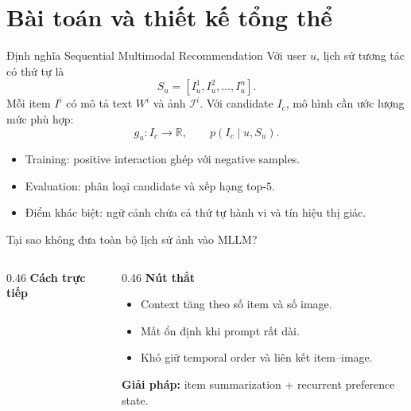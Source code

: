 \section{Bài toán và thiết kế tổng thể}
\begin{frame}{Định nghĩa Sequential Multimodal Recommendation}
  Với user $u$, lịch sử tương tác có thứ tự là
  \begin{equation*}S_u=[I_u^1,I_u^2,\ldots,I_u^n].\end{equation*}
  Mỗi item $I^i$ có mô tả text $W^i$ và ảnh $\mathcal{I}^i$. Với candidate $I_c$, mô hình cần ước lượng mức phù hợp:
  \begin{equation*}
    g_u:I_c\rightarrow\mathbb{R},\qquad p(I_c\mid u,S_u).
  \end{equation*}
  \begin{itemize}
    \item Training: positive interaction ghép với negative samples.
    \item Evaluation: phân loại candidate và xếp hạng top-$5$.
    \item Điểm khác biệt: ngữ cảnh chứa cả thứ tự hành vi và tín hiệu thị giác.
  \end{itemize}
\end{frame}

\begin{frame}{Tại sao không đưa toàn bộ lịch sử ảnh vào MLLM?}
  \begin{columns}[T,onlytextwidth]
    \begin{column}{0.46\textwidth}
      \centering\textbf{Cách trực tiếp}\par\vspace{0.2cm}
    \end{column}
    \begin{column}{0.46\textwidth}
      \centering\textbf{Nút thắt}\par\vspace{0.2cm}
      \small
      \begin{itemize}
        \item Context tăng theo số item và số image.
        \item Mất ổn định khi prompt rất dài.
        \item Khó giữ temporal order và liên kết item–image.
      \end{itemize}
      \vspace{0.15cm}\textcolor{Logo1}{\textbf{Giải pháp:}} item summarization + recurrent preference state.
    \end{column}
  \end{columns}
\end{frame}
